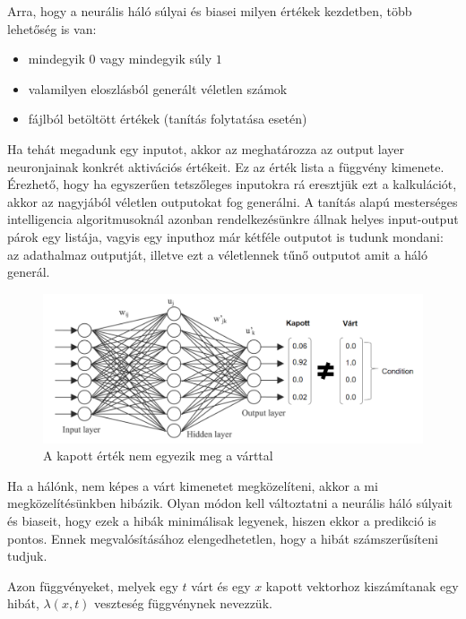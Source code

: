Arra, hogy a neurális háló súlyai és biasei milyen értékek kezdetben, több lehetőség is van:
\begin{itemize}  
	\item mindegyik $0$ vagy mindegyik súly $1$
	\item valamilyen eloszlásból generált véletlen számok
	\item fájlból betöltött értékek (tanítás folytatása esetén)
\end{itemize}

Ha tehát megadunk egy inputot, akkor az meghatározza az output layer neuronjainak konkrét aktivációs értékeit. Ez az érték lista a függvény kimenete. Érezhető, hogy ha egyszerűen tetszőleges inputokra rá eresztjük ezt a kalkulációt, akkor az nagyjából véletlen outputokat fog generálni. A tanítás alapú mesterséges intelligencia algoritmusoknál azonban rendelkezésünkre állnak helyes input-output párok egy listája, vagyis egy inputhoz már kétféle outputot is tudunk mondani: az adathalmaz outputját, illetve ezt a véletlennek tűnő outputot amit a háló generál.

\begin{figure}[h!]
  
	\begin{center}
	\includegraphics[width=\linewidth]{kapott_vart.png}
	\end{center}
	
  \caption{A kapott érték nem egyezik meg a várttal}
\end{figure}

Ha a hálónk, nem képes a várt kimenetet megközelíteni, akkor a mi megközelítésünkben hibázik. Olyan módon kell változtatni a neurális háló súlyait és biaseit, hogy ezek a hibák minimálisak legyenek, hiszen ekkor a predikció is pontos. Ennek megvalósításához elengedhetetlen, hogy a hibát számszerűsíteni tudjuk.

Azon függvényeket, melyek egy $t$ várt és egy $x$ kapott vektorhoz kiszámítanak egy hibát, $\lambda(x,t)$ veszteség függvénynek nevezzük.

